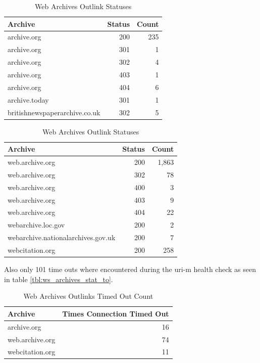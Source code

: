 \documentclass[11pt]{article}
\begin{document}
\begin{table}[H]
	\caption{Web Archives Outlink Statuses}
	\label{tbl:ws_archives_stat}
		\begin{minipage}{.5\linewidth}
	\centering
	\begin{tabular}{lrr}
\hline
 Archive                            &   Status &   Count \\
\hline
  archive.org &      200 &     235 \\
 archive.org &      301 &       1 \\
 archive.org &      302 &       4 \\
 archive.org &      403 &       1 \\
 archive.org &      404 &       6 \\
  archive.today &      301 &       1 \\
 britishnewspaperarchive.co.uk      &      302 &       5 \\
\hline
\end{tabular}
	\end{minipage} 
	\begin{minipage}{.5\linewidth}
		\centering
		\begin{tabular}{lrr}
\hline
 Archive                            &   Status &   Count \\
\hline
 web.archive.org &      200 &    1,863 \\
 web.archive.org &      302 &      78 \\
 web.archive.org &      400 &       3 \\
 web.archive.org &      403 &       9 \\
 web.archive.org &      404 &      22 \\
 webarchive.loc.gov                 &      200 &       2 \\
 webarchive.nationalarchives.gov.uk &      200 &       7 \\
 webcitation.org &      200 &     258 \\
\hline
\end{tabular}
	\end{minipage} 
\end{table}
Also only 101 time outs where encountered during the uri-m health check as seen in table \autoref{tbl:ws_archives_stat_to}.
\begin{table}[H]
	\caption{Web Archives Outlinks  Timed Out Count}
	\label{tbl:ws_archives_stat_to}
	\centering
\begin{tabular}{lr}
\hline
 Archive                            &   Times Connection Timed Out \\
\hline
 archive.org                        &               16 \\
 web.archive.org                    &             74\\
 webcitation.org                    &               11 \\
\hline
\end{tabular}
\end{table}
\end{document}
